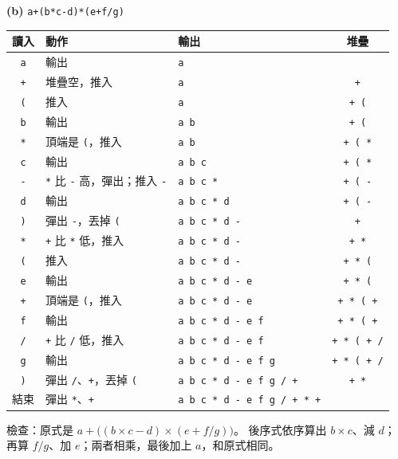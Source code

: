 \begin{pastsoln}
\textbf{(b)} \texttt{a+(b*c-d)*(e+f/g)}
\begin{center}
\small
\begin{tabular}{cllc}
\toprule
讀入 & 動作 & 輸出 & 堆疊 \\
\midrule
\texttt{a} & 輸出 & \texttt{a} & \\
\texttt{+} & 堆疊空，推入 & \texttt{a} & \texttt{+} \\
\texttt{(} & 推入 & \texttt{a} & \texttt{+ (} \\
\texttt{b} & 輸出 & \texttt{a b} & \texttt{+ (} \\
\texttt{*} & 頂端是 \texttt{(}，推入 & \texttt{a b} & \texttt{+ ( *} \\
\texttt{c} & 輸出 & \texttt{a b c} & \texttt{+ ( *} \\
\texttt{-} & \texttt{*} 比 \texttt{-} 高，彈出；推入 \texttt{-} & \texttt{a b c *} & \texttt{+ ( -} \\
\texttt{d} & 輸出 & \texttt{a b c * d} & \texttt{+ ( -} \\
\texttt{)} & 彈出 \texttt{-}，丟掉 \texttt{(} & \texttt{a b c * d -} & \texttt{+} \\
\texttt{*} & \texttt{+} 比 \texttt{*} 低，推入 & \texttt{a b c * d -} & \texttt{+ *} \\
\texttt{(} & 推入 & \texttt{a b c * d -} & \texttt{+ * (} \\
\texttt{e} & 輸出 & \texttt{a b c * d - e} & \texttt{+ * (} \\
\texttt{+} & 頂端是 \texttt{(}，推入 & \texttt{a b c * d - e} & \texttt{+ * ( +} \\
\texttt{f} & 輸出 & \texttt{a b c * d - e f} & \texttt{+ * ( +} \\
\texttt{/} & \texttt{+} 比 \texttt{/} 低，推入 & \texttt{a b c * d - e f} & \texttt{+ * ( + /} \\
\texttt{g} & 輸出 & \texttt{a b c * d - e f g} & \texttt{+ * ( + /} \\
\texttt{)} & 彈出 \texttt{/}、\texttt{+}，丟掉 \texttt{(} & \texttt{a b c * d - e f g / +} & \texttt{+ *} \\
結束 & 彈出 \texttt{*}、\texttt{+} & \texttt{a b c * d - e f g / + * +} & \\
\bottomrule
\end{tabular}
\end{center}
檢查：原式是 $a + \bigl((b \times c - d) \times (e + f / g)\bigr)$。 後序式依序算出 $b \times c$、減 $d$；
再算 $f / g$、加 $e$；兩者相乘，最後加上 $a$，和原式相同。
\end{pastsoln}
